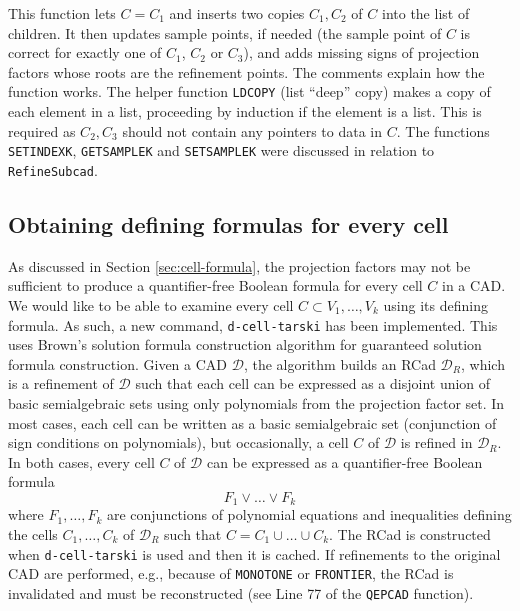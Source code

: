\documentclass[
]{book}
\theoremstyle{definition}
\theoremstyle{definition}
\theoremstyle{definition}
\theoremstyle{definition}
\theoremstyle{remark}
\begin{document}
This function lets \(C = C_1\) and inserts two copies \(C_1,C_2\) of \(C\) into the list of children. It then updates sample points, if needed (the sample point of \(C\) is correct for exactly one of \(C_1\), \(C_2\) or \(C_3\)), and adds missing signs of projection factors whose roots are the refinement points.
The comments explain how the function works. The helper function \texttt{LDCOPY} (list ``deep'' copy) makes a copy of each element in a list, proceeding by induction if the element is a list. This is required as \(C_2,C_3\) should not contain any pointers to data in \(C\). The functions \texttt{SETINDEXK}, \texttt{GETSAMPLEK} and \texttt{SETSAMPLEK} were discussed in relation to \texttt{RefineSubcad}.

\hypertarget{obtaining-defining-formulas-for-every-cell}{%
\subsection{Obtaining defining formulas for every cell}\label{obtaining-defining-formulas-for-every-cell}}

As discussed in Section \ref{sec:cell-formula}, the projection factors may not be sufficient to produce a quantifier-free Boolean formula for every cell \(C\) in a CAD.
We would like to be able to examine every cell \(C \subset V_1,\ldots,V_k\) using its defining formula.
As such, a new command, \texttt{d-cell-tarski} has been implemented.
This uses Brown's solution formula construction algorithm for guaranteed solution formula construction. Given a CAD \(\mathcal{D}\), the algorithm builds an RCad \(\mathcal{D}_R\), which is a refinement of \(\mathcal{D}\) such that each cell can be expressed as a disjoint union of basic semialgebraic sets using only polynomials from the projection factor set.
In most cases, each cell can be written as a basic semialgebraic set (conjunction of sign conditions on polynomials), but occasionally, a cell \(C\) of \(\mathcal{D}\) is refined in \(\mathcal{D}_R\).
In both cases, every cell \(C\) of \(\mathcal{D}\) can be expressed as a quantifier-free Boolean formula
\[
F_1 \lor \ldots \lor F_k
\]
where \(F_1,\ldots,F_k\) are conjunctions of polynomial equations and inequalities defining the cells \(C_1,\ldots,C_k\) of \(\mathcal{D}_R\) such that \(C = C_1\cup\ldots\cup C_k\).
The RCad is constructed when \texttt{d-cell-tarski} is used and then it is cached. If refinements to the original CAD are performed, e.g., because of \texttt{MONOTONE} or \texttt{FRONTIER}, the RCad is invalidated and must be reconstructed (see Line 77 of the \texttt{QEPCAD} function).
\end{document}
